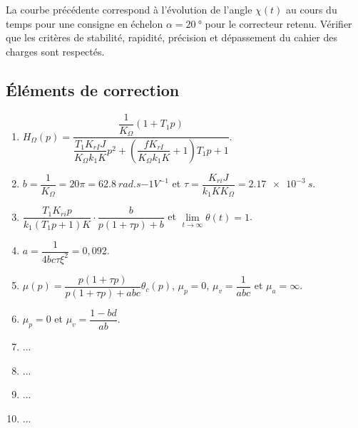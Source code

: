 \begin{multicols}{2}
La courbe précédente %
correspond à l'évolution de l'angle $\chi(t)$ au cours du temps pour une consigne en échelon $\alpha=\SI{20}{\degree}$ pour le correcteur retenu. Vérifier que les critères de stabilité, rapidité, précision et dépassement du cahier des charges sont respectés.









\ifcolle
\else
\subsection*{Éléments de correction}
\begin{enumerate}
\item $H_{\Omega}(p)=\dfrac{\dfrac{1}{K_{\Omega}}\left( 1 + T_{1}p \right)}{\dfrac{T_{1} K_{rI}J}{K_{\Omega}k_{1}K}p^2+\left(\dfrac{f K_{rI}}{K_{\Omega}k_{1}K}+1\right)T_{1}p + 1 }$.
\item  $b=\dfrac{1}{K_{\Omega}} = 20 \pi = \SI{62,8}{rad.s{-1}V^{-1}}$ et $\tau=\dfrac{K_{ri}J}{k_1KK_{\Omega}}=\SI{2,17e-3}{s}$.
\item $\dfrac{T_{1}K_{ri}p}{ k_{1}\left( T_{1}p + 1 \right)K}\cdot \dfrac{b}{p\left(1+\tau p \right)+b}$ et $\lim\limits_{t\to\infty} \theta(t) = 1$.
\item  ${a}=\dfrac{1}{4bc\tau\xi^2}=0,092$.
\item $\mu(p)=\dfrac{p\left( 1+\tau p\right)}{p\left( 1+\tau p\right)+abc}\theta_c(p)$, $\mu_p = 0$, $\mu_v = \dfrac{1}{abc}$ et  $\mu_a = \infty$.
\item $\mu_p=0$ et $\mu_v= \dfrac{1 -bd}{ab}$.
\item ...
\item ...
\item ...
\item ...
\end{enumerate}
\fi

\end{multicols}


%

%
%
%
%
